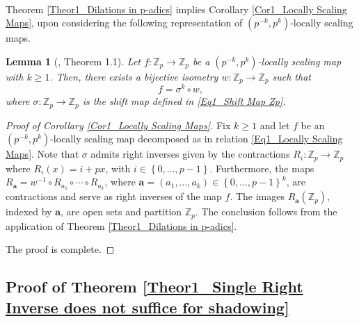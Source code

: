 \documentclass[a4paper, 12pt]{article}
\newtheorem{lemma}[theorem]{Lemma}
\theoremstyle{definition}
\begin{document}
	
	
	
	\paragraph{}
	
	Theorem \ref{Theor1_Dilations in p-adics} implies Corollary \ref{Cor1_Locally Scaling Maps}, upon considering the following representation of $ \left(  p^{-k}, p^{k} \right) $-locally scaling maps. 
	
	
	\begin{lemma}[\cite{Furno-Natural_Extensions_for_p-adic-beta-shifts_and_other_scaling_maps}, Theorem 1.1]\label{Lem1_Locally Scaling Maps} 
		Let $f: \mathbb{Z}_{p} \to \mathbb{Z}_{p}$ be a $ \left(  p^{-k}, p^{k}  \right) $-locally scaling map with $k \ge 1$. Then, there exists a bijective isometry $w: \mathbb{Z}_{p} \to \mathbb{Z}_{p}$ such that
		\begin{equation}\label{Eq1_Locally Scaling Maps}
			f   =   \sigma^{k} \circ w ,
		\end{equation}
		where $\sigma: \mathbb{Z}_{p} \to \mathbb{Z}_{p}$ is the shift map defined in \eqref{Eq1_Shift Map Zp}.
		
	\end{lemma}
	
	
	\begin{proof}[Proof of Corollary \ref{Cor1_Locally Scaling Maps}] 
		Fix $k \ge 1$ and let $f$ be an $ \left(  p^{-k}, p^{k}  \right) $-locally scaling map 
		decomposed as in relation \eqref{Eq1_Locally Scaling Maps}. Note that $\sigma$ admits right inverses given by the contractions $R_{i}: \mathbb{Z}_{p} \to \mathbb{Z}_{p}$ where $ R_{i}(x)= i + px$, with $i \in  \left\{  0, \dots, p-1  \right\} $. 
		Furthermore, the maps $R_{ \mathbf{a}} = w^{-1}\circ R_{a_{1}} \circ \cdots \circ R_{a_{k}}$, where $ \mathbf{a} =  \left(  a_{1}, \dots, a_{k}  \right)  \in  \left\{  0, \dots, p-1  \right\} ^{k}$, are contractions and serve as right inverses of the map $f$. The images $R_{ \mathbf{a}} \left(  \mathbb{Z}_{p}  \right) $, indexed by $ \mathbf{a}$, are open sets and partition $\mathbb{Z}_{p}$. The conclusion follows from the application of Theorem \ref{Theor1_Dilations in p-adics}.
		
		The proof is complete. 
		
		
	\end{proof}
	
	
	
	
	
	
	\subsection{Proof of Theorem \ref{Theor1_Single Right Inverse does not suffice for shadowing} }
	
\end{document}

